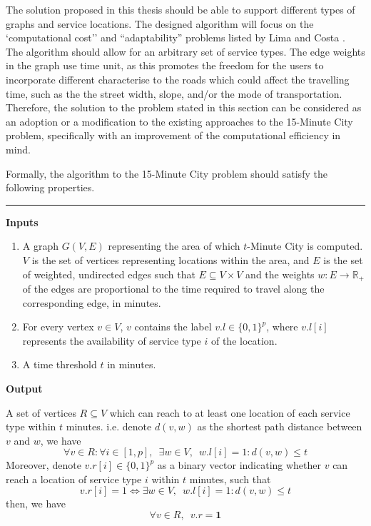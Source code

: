 The solution proposed in this thesis should be able to support different types of graphs and service locations. The designed algorithm will focus on the `computational cost'' and ``adaptability'' problems listed by Lima and Costa \cite{lima_quest_2023}. The algorithm should allow for an arbitrary set of service types. The edge weights in the graph use time unit, as this promotes the freedom for the users to incorporate different characterise to the roads which could affect the travelling time, such as the the street width, slope, and/or the mode of transportation. Therefore, the solution to the problem stated in this section can be considered as an adoption or a modification to the existing approaches to the 15-Minute City problem, specifically with an improvement of the computational efficiency in mind.

Formally, the algorithm to the 15-Minute City problem should satisfy the following properties.


\rule{\textwidth}{0.4pt}

\textbf{Inputs}
\begin{enumerate}
    \item A graph $G(V,E)$ representing the area of which $t$-Minute City is computed. $V$ is the set of vertices representing locations within the area, and $E$ is the set of weighted, undirected edges such that $E\subseteq V\times V$ and the weights $w:E\rightarrow\mathbb{R}_{+}$ of the edges are proportional to the time required to travel along the corresponding edge, in minutes.
    \item For every vertex $v\in V$, $v$ contains the label $v.l\in\{0,1\}^p$, where $v.l[i]$ represents the availability of service type $i$ of the location.
    \item A time threshold $t$ in minutes.
\end{enumerate}

\textbf{Output}

A set of vertices $R\subseteq V$ which can reach to at least one location of each service type within $t$ minutes. i.e. denote $d(v,w)$ as the shortest path distance between $v$ and $w$, we have $$\forall v\in R:\forall i\in[1,p],\enspace\exists w\in V,\enspace w.l[i]=1:d(v,w)\leq t$$ Moreover, denote $v.r[i]\in\{0,1\}^p$ as a binary vector indicating whether $v$ can reach a location of service type $i$ within $t$ minutes, such that $$v.r[i]=1\iff\exists w\in V,\enspace w.l[i]=1:d(v,w)\leq t$$ then, we have $$\forall v\in R,\enspace v.r = \mathbf{1}$$

